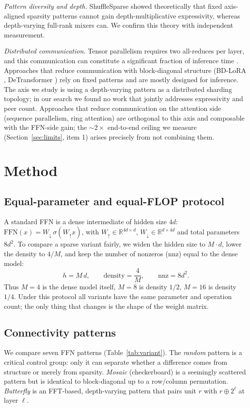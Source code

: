 \documentclass[10pt,journal]{IEEEtran}
\begin{document}
\emph{Pattern diversity and depth.} ShuffleSparse \cite{shufflesparse2025} showed theoretically
that fixed axis-aligned sparsity patterns cannot gain depth-multiplicative expressivity, whereas
depth-varying full-rank mixers can. We confirm this theory with independent measurement.

\emph{Distributed communication.} Tensor parallelism requires two all-reduces per layer, and
this communication can constitute a significant fraction of inference time \cite{flashcomm2024}.
Approaches that reduce communication with block-diagonal structure (BD-LoRA \cite{bdlora2025},
DeTransformer \cite{detransformer2024}) rely on fixed patterns and are mostly designed for
inference. The axis we study is using a depth-varying pattern as a distributed sharding
topology; in our search we found no work that jointly addresses expressivity and peer count.
Approaches that reduce communication on the attention side (sequence parallelism, ring
attention) are orthogonal to this axis and composable with the FFN-side gain; the
$\sim\!2\times$ end-to-end ceiling we measure (Section~\ref{sec:limits}, item 1) arises
precisely from not combining them.

\section{Method}
\subsection{Equal-parameter and equal-FLOP protocol}
A standard FFN is a dense intermediate of hidden size $4d$:
$\mathrm{FFN}(x) = W_{\downarrow}\,\sigma(W_{\uparrow}x)$, with
$W_{\uparrow}\in\mathbb{R}^{4d\times d}$, $W_{\downarrow}\in\mathbb{R}^{d\times 4d}$ and total
parameters $8d^2$. To compare a sparse variant fairly, we widen the hidden size to $M\!\cdot\!d$,
lower the density to $4/M$, and keep the number of nonzeros (nnz) equal to the dense model:
\begin{equation}
h = M\,d, \qquad \text{density} = \frac{4}{M}, \qquad \mathrm{nnz} = 8d^2 .
\end{equation}
Thus $M=4$ is the dense model itself, $M=8$ is density $1/2$, $M=16$ is density $1/4$. Under this
protocol all variants have the same parameter and operation count; the only thing that changes is
the shape of the weight matrix.

\subsection{Connectivity patterns}
We compare seven FFN patterns (Table~\ref{tab:variant}). The \emph{random} pattern is a critical
control group: only it can separate whether a difference comes from structure or merely from
sparsity. \emph{Mosaic} (checkerboard) is a seemingly scattered pattern but is identical to
block-diagonal up to a row/column permutation. \emph{Butterfly} is an FFT-based, depth-varying
pattern that pairs unit $r$ with $r \oplus 2^{\ell}$ at layer $\ell$.
\end{document}
